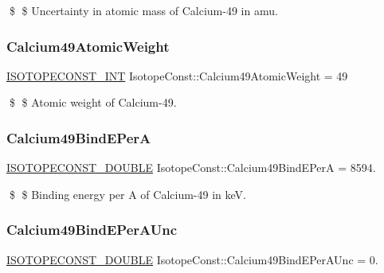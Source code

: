 \$ \$ Uncertainty in atomic mass of Calcium-\/49 in amu. \mbox{\label{group___isotope_const-_calcium-_ca49_gadb551dc804acf3b73c1dd6917e12c258}} 
\subsubsection{\texorpdfstring{Calcium49\+Atomic\+Weight}{Calcium49AtomicWeight}}
{\footnotesize\ttfamily \mbox{\hyperlink{group___isotope_const-_macros_ga5f18360b3e99483a35c32d789e62621c}{I\+S\+O\+T\+O\+P\+E\+C\+O\+N\+S\+T\+\_\+\+I\+NT}} Isotope\+Const\+::\+Calcium49\+Atomic\+Weight = 49}

\$ \$ Atomic weight of Calcium-\/49. \mbox{\label{group___isotope_const-_calcium-_ca49_ga15442ccaa0f0121c7ca07ca22eda94ec}} 
\subsubsection{\texorpdfstring{Calcium49\+Bind\+E\+PerA}{Calcium49BindEPerA}}
{\footnotesize\ttfamily \mbox{\hyperlink{group___isotope_const-_macros_ga8f45a7272ce02c0b4c65c44636ed719a}{I\+S\+O\+T\+O\+P\+E\+C\+O\+N\+S\+T\+\_\+\+D\+O\+U\+B\+LE}} Isotope\+Const\+::\+Calcium49\+Bind\+E\+PerA = 8594.}

\$ \$ Binding energy per A of Calcium-\/49 in keV. \mbox{\label{group___isotope_const-_calcium-_ca49_ga24fd463775a0200e45bd1c6402b0afa5}} 
\subsubsection{\texorpdfstring{Calcium49\+Bind\+E\+Per\+A\+Unc}{Calcium49BindEPerAUnc}}
{\footnotesize\ttfamily \mbox{\hyperlink{group___isotope_const-_macros_ga8f45a7272ce02c0b4c65c44636ed719a}{I\+S\+O\+T\+O\+P\+E\+C\+O\+N\+S\+T\+\_\+\+D\+O\+U\+B\+LE}} Isotope\+Const\+::\+Calcium49\+Bind\+E\+Per\+A\+Unc = 0.}

